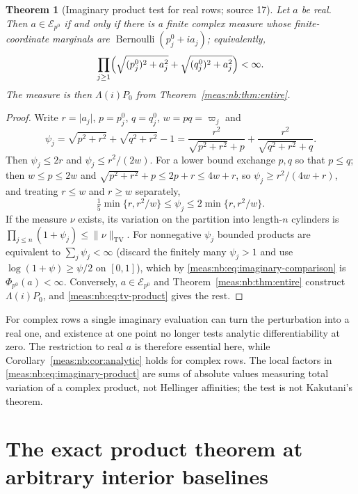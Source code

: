 \documentclass[11pt]{article}
\numberwithin{equation}{section}
\newtheorem{theorem}{Theorem}[section]
\theoremstyle{definition}
\theoremstyle{remark}
\newcommand{\TV}{\mathrm{TV}}
\newcommand{\norm}[1]{\lVert#1\rVert}
\newcommand{\abs}[1]{\lvert#1\rvert}
\newcommand{\Erow}{\mathcal E_{p^0}}
\begin{document}
\begin{theorem}[Imaginary product test for real rows; source 17]
\label{meas:nb:thm:imaginary}
Let $a$ be real. Then $a\in\Erow$ if and only if there is a finite complex measure
whose finite-coordinate marginals are $\operatorname{Bernoulli}(p_j^0+ia_j)$;
equivalently,
\begin{equation}\label{meas:nb:eq:imaginary-product}
 \prod_{j\ge1}\Bigl(\sqrt{(p_j^0)^2+a_j^2}+\sqrt{(q_j^0)^2+a_j^2}\Bigr)<\infty .
\end{equation}
The measure is then $\Lambda(i)P_0$ from Theorem~\ref{meas:nb:thm:entire}.
\end{theorem}
\begin{proof}
Write $r=\abs{a_j}$, $p=p_j^0$, $q=q_j^0$, $w=pq=\varpi_j$ and
\[
 \psi_j=\sqrt{p^2+r^2}+\sqrt{q^2+r^2}-1
 =\frac{r^2}{\sqrt{p^2+r^2}+p}+\frac{r^2}{\sqrt{q^2+r^2}+q}.
\]
Then $\psi_j\le2r$ and $\psi_j\le r^2/(2w)$. For a lower bound exchange $p,q$ so that
$p\le q$; then $w\le p\le2w$ and $\sqrt{p^2+r^2}+p\le2p+r\le4w+r$, so
$\psi_j\ge r^2/(4w+r)$, and treating $r\le w$ and $r\ge w$ separately,
\begin{equation}\label{meas:nb:eq:imaginary-comparison}
 \tfrac15\min\{r,r^2/w\}\le\psi_j\le2\min\{r,r^2/w\}.
\end{equation}
If the measure $\nu$ exists, its variation on the partition into length-$n$
cylinders is $\prod_{j\le n}(1+\psi_j)\le\norm\nu_\TV$. For nonnegative $\psi_j$
bounded products are equivalent to $\sum_j\psi_j<\infty$ (discard the finitely many
$\psi_j>1$ and use $\log(1+\psi)\ge\psi/2$ on $[0,1]$), which by
\eqref{meas:nb:eq:imaginary-comparison} is $\Phi_{p^0}(a)<\infty$. Conversely,
$a\in\Erow$ and Theorem~\ref{meas:nb:thm:entire} construct $\Lambda(i)P_0$, and
\eqref{meas:nb:eq:tv-product} gives the rest.
\end{proof}

For complex rows a single imaginary evaluation can turn the perturbation into a
real one, and existence at one point no longer tests analytic differentiability at
zero. The restriction to real $a$ is therefore essential here, while
Corollary~\ref{meas:nb:cor:analytic} holds for complex rows. The local factors in
\eqref{meas:nb:eq:imaginary-product} are sums of absolute values measuring total
variation of a complex product, not Hellinger affinities; the test is not
Kakutani's theorem.

\section{The exact product theorem at arbitrary interior baselines}
\label{meas:nb:sec:hahn}
\end{document}
